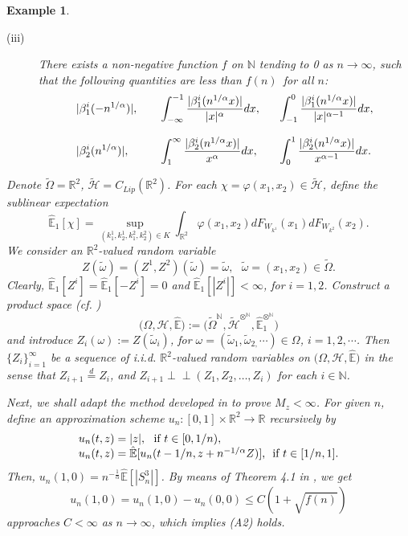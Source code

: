 \documentclass[a4paper,oneside,10pt]{article}%
\newtheorem{example}[theorem]{Example}
\numberwithin{equation}{section}
\begin{document}
\begin{example}
\begin{description}
\item[(iii)] There exists a non-negative function $f$ on $\mathbb{N}$ tending
to 0 as $n\rightarrow \infty$, such that the following quantities are less than
$f(n)$\ for all $n$:
\[%
\begin{array}
[c]{lll}%
\displaystyle|\beta_{1}^{i}(-n^{1/\alpha})|,\text{ \  \ } & \displaystyle \int
_{-\infty}^{-1}\frac{|\beta_{1}^{i}(n^{1/\alpha}x)|}{|x|^{\alpha}}dx,\text{
\ } & \displaystyle \int_{-1}^{0}\frac{|\beta_{1}^{i}(n^{1/\alpha}%
x)|}{|x|^{\alpha-1}}dx,\\
&  & \\
\displaystyle|\beta_{2}^{i}(n^{1/\alpha})|,\text{ \ } & \displaystyle \int
_{1}^{\infty}\frac{|\beta_{2}^{i}(n^{1/\alpha}x)|}{x^{\alpha}}dx,\text{ \ } &
\displaystyle \int_{0}^{1}\frac{|\beta_{2}^{i}(n^{1/\alpha}x)|}{x^{\alpha-1}%
}dx.
\end{array}
\]

\end{description}

Denote $\tilde{\Omega}=\mathbb{R}^{2}$, $\mathcal{\tilde{H}}=C_{Lip}%
(\mathbb{R}^{2})$. For each $\chi=\varphi(x_{1},x_{2})\in \mathcal{\tilde{H}}$,
define the sublinear expectation
\[
\mathbb{\hat{E}}_{1}[\chi]=\sup_{(k_{1}^{1},k_{2}^{1},k_{1}^{2},k_{2}^{2})\in
K}\int_{\mathbb{R}^{2}}\varphi(x_{1},x_{2})dF_{W_{k^{1}}}(x_{1})dF_{W_{k^{2}}%
}(x_{2}).
\]
We consider an $\mathbb{R}^{2}$-valued random variable%
\[
Z(\tilde{\omega})=(Z^{1},Z^{2})(\tilde{\omega})=\tilde{\omega},\text{\  \ }%
\tilde{\omega}=(x_{1},x_{2})\in \tilde{\Omega}.
\]
Clearly, $\mathbb{\hat{E}}_{1}[Z^{i}]=\mathbb{\hat{E}}_{1}[-Z^{i}]=0$ and
$\mathbb{\hat{E}}_{1}[|Z^{i}|]<\infty$, for $i=1,2$. Construct a product space
(cf. \cite{P2010})
\[
\big(\Omega,\mathcal{H},\mathbb{\hat{E}}\big):=\big(\tilde{\Omega}%
^{\mathbb{N}},\tilde{\mathcal{H}}^{\otimes^{\mathbb{N}}},\mathbb{\hat{E}}%
_{1}^{\otimes^{\mathbb{N}}}\big)
\]
and introduce $Z_{i}(\omega):=Z(\tilde{\omega}_{i})$, for $\omega
=(\tilde{\omega}_{1},\tilde{\omega}_{2,}\cdots)\in \Omega$, $i=1,2,\cdots$.
Then $\{Z_{i}\}_{i=1}^{\infty}$ be a sequence of i.i.d. $\mathbb{R}^{2}%
$-valued random variables on $\big(\Omega,\mathcal{H},\mathbb{\hat{E}}\big)$
in the sense that $Z_{i+1}\overset{d}{=}Z_{i}$, and $Z_{i+1}\perp \! \! \!
\perp(Z_{1},Z_{2},\ldots,Z_{i})$ for each $i\in \mathbb{N}$.

Next, we shall adapt the method developed in \cite{HJL2021} to prove
$M_{z}<\infty$. For given $n$, define an approximation scheme $u_{n}%
:[0,1]\times \mathbb{R}^{2}\rightarrow \mathbb{R}$ recursively by
\[%
\begin{array}
[c]{l}%
u_{n}(t,z)=|z|,\text{ \ if }t\in \lbrack0,1/n),\\
u_{n}(t,z)=\mathbb{\hat{E}}[u_{n}(t-1/n,z+n^{-1/\alpha}Z)]\text{, \ if }%
t\in \lbrack1/n,1].
\end{array}
\]
Then, $u_{n}(1,0)=n^{-\frac{1}{\alpha}}\mathbb{\hat{E}}[|S_{n}^{3}|]$. By
means of Theorem 4.1 in \cite{HJL2021}, we get
\[
u_{n}(1,0)=u_{n}(1,0)-u_{n}(0,0)\leq C(1+\sqrt{f(n)})
\]
approaches $C<\infty$ as $n\rightarrow \infty$, which implies (A2) holds.


\end{example}
\end{document}
